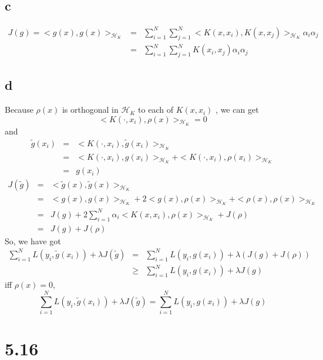 \documentclass[11pt, oneside]{article}   	%
\begin{document}
\subsection{c}
\begin{eqnarray}
J(g) = <g(x), g(x)>_{\mathcal{H}_K} &=& \sum_{i=1}^{N}\sum_{j=1}^{N} <K(x, x_i), K(x, x_j)>_{\mathcal{H}_K} \alpha_i \alpha_j \\
&=& \sum_{i=1}^{N}\sum_{j=1}^{N} K(x_i, x_j) \alpha_i \alpha_j
\end{eqnarray}

\subsection{d}

Because $\rho(x)$ is orthogonal in 
$\mathcal{H}_K$ to each of 
$K (x, x_i )$ , we can get 
\begin{equation}
<K (\cdot, x_i ), \rho(x)>_{\mathcal{H}_K} = 0
\end{equation}
and 
\begin{eqnarray}
\tilde{g}(x_i) &=& <K(\cdot, x_i), \tilde{g}(x_i)>_{\mathcal{H}_K}\\
&=& <K(\cdot, x_i), g(x_i)>_{\mathcal{H}_K}+ <K(\cdot, x_i), \rho(x_i)>_{\mathcal{H}_K}\\
&=& {g}(x_i)
\end{eqnarray}
\begin{eqnarray}
J(\tilde{g}) &=& <\tilde{g}(x), \tilde{g}(x)>_{\mathcal{H}_K}\\
&=& <{g}(x), g(x)>_{\mathcal{H}_K} + 2<{g}(x), \rho(x)>_{\mathcal{H}_K} + < \rho(x), \rho(x)>_{\mathcal{H}_K}\\
&=& J(g) + 2 \sum_{i=1}^{N} \alpha_i <K(x, x_i), \rho(x)>_{\mathcal{H}_K} + J(\rho)\\
&=& J(g) + J(\rho)
\end{eqnarray} 
So, we have got 
\begin{eqnarray}
\sum_{i=1}^{N} L(y_i, \tilde{g}(x_i)) + \lambda J(\tilde{g}) &=& \sum_{i=1}^{N} L(y_i, {g}(x_i)) + \lambda (J(g) + J(\rho))\\
&\ge& \sum_{i=1}^{N} L(y_i, {g}(x_i)) + \lambda J(g)
\end{eqnarray} 
iff $\rho(x) = 0$, 
\begin{equation}
\sum_{i=1}^{N} L(y_i, \tilde{g}(x_i)) + \lambda J(\tilde{g}) = \sum_{i=1}^{N} L(y_i, {g}(x_i)) + \lambda J(g)
\end{equation}

\section{5.16}
\end{document}
